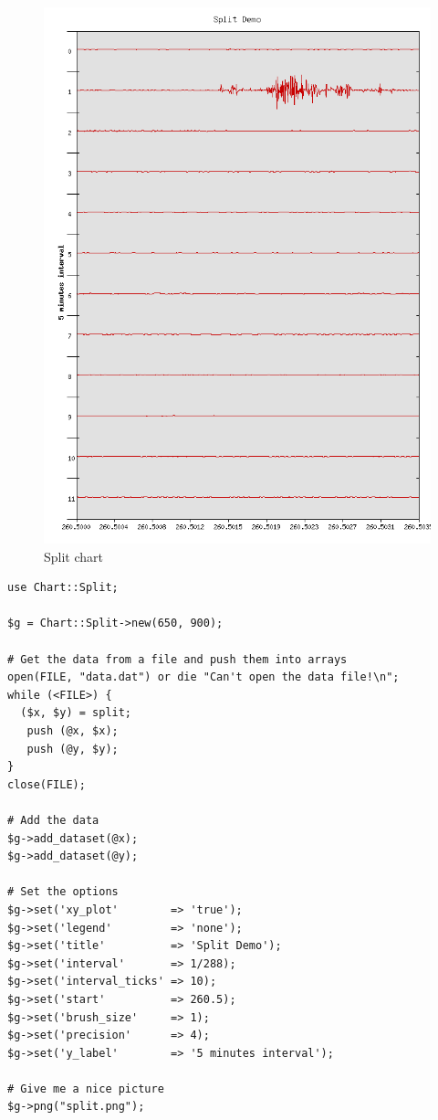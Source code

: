 \begin{figure}[ht]
  \begin{center}
    \includegraphics[width=\textwidth, height=\textwidth]{stunde.png}
  \end{center}
  \caption{Split chart}
  \label{fig:split}
\end{figure}
\begin{verbatim}
use Chart::Split;

$g = Chart::Split->new(650, 900);

# Get the data from a file and push them into arrays
open(FILE, "data.dat") or die "Can't open the data file!\n";
while (<FILE>) {
  ($x, $y) = split;
   push (@x, $x);
   push (@y, $y);
}
close(FILE);

# Add the data
$g->add_dataset(@x);
$g->add_dataset(@y);

# Set the options
$g->set('xy_plot'        => 'true');
$g->set('legend'         => 'none');
$g->set('title'          => 'Split Demo');
$g->set('interval'       => 1/288);
$g->set('interval_ticks' => 10);
$g->set('start'          => 260.5);
$g->set('brush_size'     => 1);
$g->set('precision'      => 4);
$g->set('y_label'        => '5 minutes interval');

# Give me a nice picture
$g->png("split.png");
\end{verbatim}

